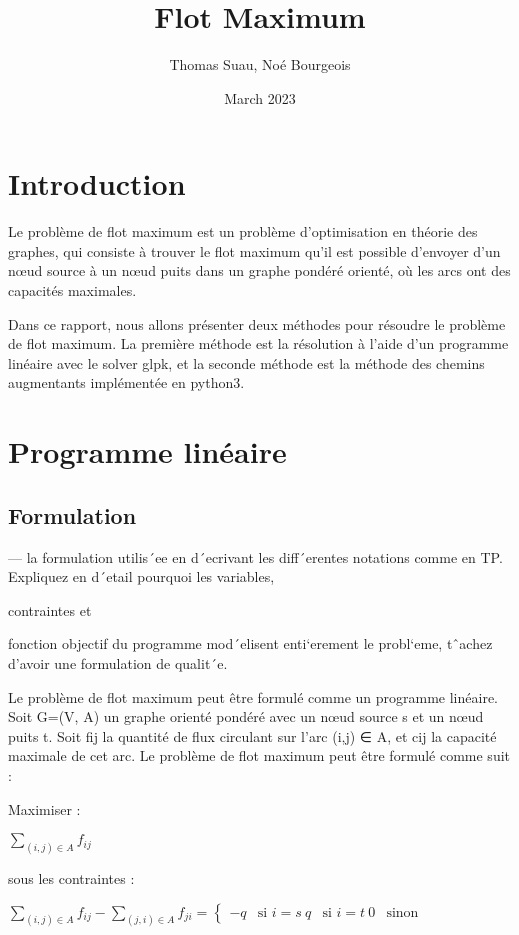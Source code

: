 \documentclass{article}
\title{Flot Maximum}
\author{Thomas Suau, Noé Bourgeois }
\date{March 2023}
\begin{document}
    \maketitle
    \tableofcontents
    \newpage

    \section{Introduction}
    Le problème de flot maximum est un problème d'optimisation en théorie des graphes,
    qui consiste à trouver le flot maximum qu'il est possible d'envoyer d'un nœud source à un nœud puits
    dans un graphe pondéré orienté,
    où les arcs ont des capacités maximales.

    Dans ce rapport, nous allons présenter deux méthodes
    pour résoudre le problème de flot maximum.
    La première méthode est la résolution à l'aide d'un programme linéaire avec le solver glpk,
    et la seconde méthode est la méthode des chemins augmentants implémentée en python3.


    \section{Programme linéaire}
    \subsection{Formulation}
       — la formulation utilis´ee en d´ecrivant les diff´erentes notations comme en TP.
       Expliquez en d´etail pourquoi les
       variables,

       contraintes et

       fonction objectif du programme mod´elisent enti`erement le
    probl`eme, tˆachez d’avoir une formulation de qualit´e.


        Le problème de flot maximum peut être formulé comme un programme linéaire.
       Soit G=(V, A) un graphe orienté pondéré avec un nœud source s et un nœud puits t.
       Soit fij la quantité de flux circulant sur l'arc (i,j) ∈ A,
       et cij la capacité maximale de cet arc.
       Le problème de flot maximum peut être formulé comme suit :

    Maximiser :

$\sum_{(i,j) \in A} f_{ij}$

sous les contraintes :

$\sum_{(i,j) \in A} f_{ij} - \sum_{(j,i) \in A} f_{ji} =
\begin{cases}
-q & \text{si } i=s \
q & \text{si } i=t \
0 & \text{sinon}
\end{cases}$
\end{document}
